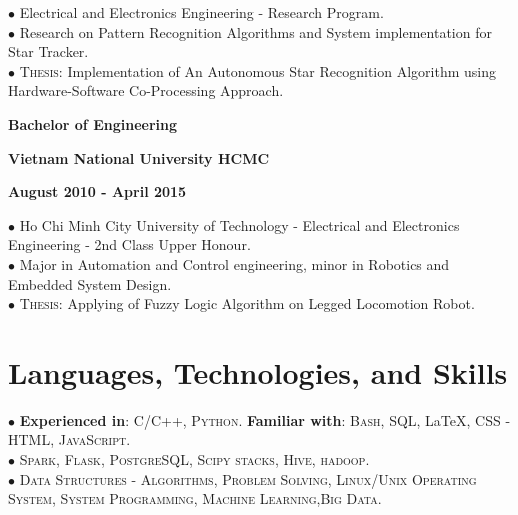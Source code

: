 \documentclass[10pt]{article}
\begin{document}
        \vspace{-5mm}

        $\bullet$ {Electrical and Electronics Engineering - Research Program.} \\
        $\bullet$ {Research on Pattern Recognition Algorithms and System implementation for Star Tracker.} \\
        $\bullet$ \textsc{Thesis}: Implementation of An Autonomous Star Recognition Algorithm using Hardware-Software Co-Processing Approach.


        \begin{multicols}{3}
            \begin{flushleft}
                \textbf{Bachelor of Engineering}
            \end{flushleft}

            \columnbreak

            \begin{center}
                \textbf{Vietnam National University HCMC}
            \end{center}

            \columnbreak

            \begin{flushright}
                \textbf{August 2010 - April 2015}
            \end{flushright}
        \end{multicols}

        \vspace{-5mm}

        $\bullet$ {Ho Chi Minh City University of Technology - Electrical and Electronics Engineering - 2nd Class Upper Honour.} \\
        $\bullet$ {Major in Automation and Control engineering, minor in Robotics and Embedded System Design.} \\
        $\bullet$ \textsc{Thesis}: Applying of Fuzzy Logic Algorithm on Legged Locomotion Robot.

    \section{Languages, Technologies, and Skills}

        \vspace{-2mm}

        $\bullet$ \textbf{Experienced in}: \textsc{C/C++}, \textsc{Python}. \textbf{Familiar with}: \textsc{Bash}, \textsc{SQL}, \LaTeX, \textsc{CSS - HTML}, \textsc{JavaScript}. \\
        $\bullet$ \textsc{Spark}, \textsc{Flask}, \textsc{PostgreSQL}, \textsc{Scipy stacks}, \textsc{Hive}, \textsc{hadoop}. \\
        $\bullet$ \textsc{Data Structures - Algorithms}, \textsc{Problem Solving}, \textsc{Linux/Unix Operating System}, \textsc{System Programming}, \textsc{Machine Learning},\textsc{Big Data}.
\end{document}
